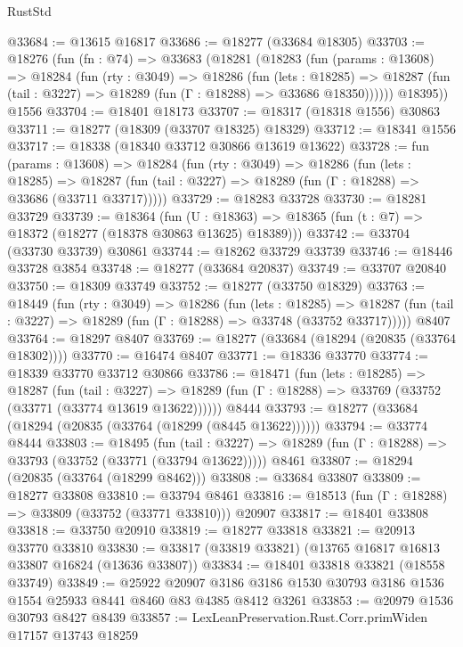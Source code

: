 \begin{lexlean}{RustStd}
\begin{coremodule}
@33684 := @13615 @16817
@33686 := @18277 (@33684 @18305)
@33703 := @18276
    (fun (fn : @74) =>
    @33683
      (@18281
        (@18283
          (fun (params : @13608) =>
          @18284
            (fun (rty : @3049) =>
            @18286
              (fun (lets : @18285) =>
              @18287 (fun (tail : @3227) => @18289 (fun (Γ : @18288) => @33686 @18350))))))
        @18395))
    @1556
@33704 := @18401 @18173
@33707 := @18317 (@18318 @1556) @30863
@33711 := @18277 (@18309 (@33707 @18325) @18329)
@33712 := @18341 @1556
@33717 := @18338 (@18340 @33712 @30866 @13619 @13622)
@33728 := fun (params : @13608) =>
  @18284
    (fun (rty : @3049) =>
    @18286
      (fun (lets : @18285) =>
      @18287 (fun (tail : @3227) => @18289 (fun (Γ : @18288) => @33686 (@33711 @33717)))))
@33729 := @18283 @33728
@33730 := @18281 @33729
@33739 := @18364
    (fun (U : @18363) => @18365 (fun (t : @7) => @18372 (@18277 (@18378 @30863 @13625) @18389)))
@33742 := @33704 (@33730 @33739) @30861
@33744 := @18262 @33729 @33739
@33746 := @18446 @33728 @3854
@33748 := @18277 (@33684 @20837)
@33749 := @33707 @20840
@33750 := @18309 @33749
@33752 := @18277 (@33750 @18329)
@33763 := @18449
    (fun (rty : @3049) =>
    @18286
      (fun (lets : @18285) =>
      @18287 (fun (tail : @3227) => @18289 (fun (Γ : @18288) => @33748 (@33752 @33717)))))
    @8407
@33764 := @18297 @8407
@33769 := @18277 (@33684 (@18294 (@20835 (@33764 @18302))))
@33770 := @16474 @8407
@33771 := @18336 @33770
@33774 := @18339 @33770 @33712 @30866
@33786 := @18471
    (fun (lets : @18285) =>
    @18287
      (fun (tail : @3227) =>
      @18289 (fun (Γ : @18288) => @33769 (@33752 (@33771 (@33774 @13619 @13622))))))
    @8444
@33793 := @18277 (@33684 (@18294 (@20835 (@33764 (@18299 (@8445 @13622))))))
@33794 := @33774 @8444
@33803 := @18495
    (fun (tail : @3227) => @18289 (fun (Γ : @18288) => @33793 (@33752 (@33771 (@33794 @13622)))))
    @8461
@33807 := @18294 (@20835 (@33764 (@18299 @8462)))
@33808 := @33684 @33807
@33809 := @18277 @33808
@33810 := @33794 @8461
@33816 := @18513 (fun (Γ : @18288) => @33809 (@33752 (@33771 @33810))) @20907
@33817 := @18401 @33808
@33818 := @33750 @20910
@33819 := @18277 @33818
@33821 := @20913 @33770 @33810
@33830 := @33817 (@33819 @33821) (@13765 @16817 @16813 @33807 @16824 (@13636 @33807))
@33834 := @18401 @33818 @33821 (@18558 @33749)
@33849 := @25922
    @20907
    @3186
    @3186
    @1530
    @30793
    @3186
    @1536
    @1554
    @25933
    @8441
    @8460
    @83
    @4385
    @8412
    @3261
@33853 := @20979 @1536 @30793 @8427 @8439
@33857 := LexLeanPreservation.Rust.Corr.primWiden @17157 @13743 @18259

\end{coremodule}
\end{lexlean}
